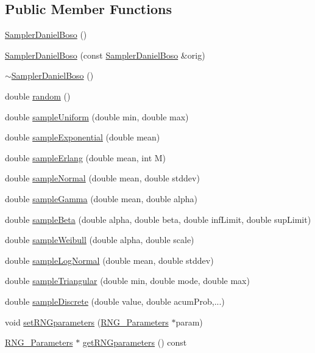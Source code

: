 \subsection*{Public Member Functions}
\begin{DoxyCompactItemize}
\item 
\hyperlink{class_sampler_daniel_boso_a9517bc3b60a2f3cb9bae4d107badab4d}{Sampler\-Daniel\-Boso} ()
\item 
\hyperlink{class_sampler_daniel_boso_ae555dc92571c4d2a39ed325bce657b61}{Sampler\-Daniel\-Boso} (const \hyperlink{class_sampler_daniel_boso}{Sampler\-Daniel\-Boso} \&orig)
\item 
\hyperlink{class_sampler_daniel_boso_a0a2ffdace9150593fab946e52435907c}{$\sim$\-Sampler\-Daniel\-Boso} ()
\item 
double \hyperlink{class_sampler_daniel_boso_a61aabe6b589b5ee1ea80cc399d133d78}{random} ()
\item 
double \hyperlink{class_sampler_daniel_boso_ab384b9076bbd7381a26716eecb122830}{sample\-Uniform} (double min, double max)
\item 
double \hyperlink{class_sampler_daniel_boso_ae17bf948b30a70762c00ea75f340f3ac}{sample\-Exponential} (double mean)
\item 
double \hyperlink{class_sampler_daniel_boso_ad26ebbe6b43df7067ff67a652a438b97}{sample\-Erlang} (double mean, int M)
\item 
double \hyperlink{class_sampler_daniel_boso_ab5ccf42855f9a5e8f9d033942c620500}{sample\-Normal} (double mean, double stddev)
\item 
double \hyperlink{class_sampler_daniel_boso_a84562c6230ad15f8a7e6dd85c0dc3ca9}{sample\-Gamma} (double mean, double alpha)
\item 
double \hyperlink{class_sampler_daniel_boso_aeb42649db302d2927c3afe3a00529246}{sample\-Beta} (double alpha, double beta, double inf\-Limit, double sup\-Limit)
\item 
double \hyperlink{class_sampler_daniel_boso_a5514d11fd1d3be7eadc8d2b310e15ab1}{sample\-Weibull} (double alpha, double scale)
\item 
double \hyperlink{class_sampler_daniel_boso_ad35ba3234553bb3033bac937c6f3cd07}{sample\-Log\-Normal} (double mean, double stddev)
\item 
double \hyperlink{class_sampler_daniel_boso_ac80c166a5f938a04d13111a000bc395b}{sample\-Triangular} (double min, double mode, double max)
\item 
double \hyperlink{class_sampler_daniel_boso_a6a8f4ce9a94dadfe5c37ced7f01c3169}{sample\-Discrete} (double value, double acum\-Prob,...)
\item 
void \hyperlink{class_sampler_daniel_boso_afd1d18b5d5bb877bc540205e4bb4f033}{set\-R\-N\-Gparameters} (\hyperlink{class_sampler__if_1_1_r_n_g___parameters}{R\-N\-G\-\_\-\-Parameters} $\ast$param)
\item 
\hyperlink{class_sampler__if_1_1_r_n_g___parameters}{R\-N\-G\-\_\-\-Parameters} $\ast$ \hyperlink{class_sampler_daniel_boso_a572e3a1660120177e9a3a5f04a4269ea}{get\-R\-N\-Gparameters} () const 
\end{DoxyCompactItemize}



